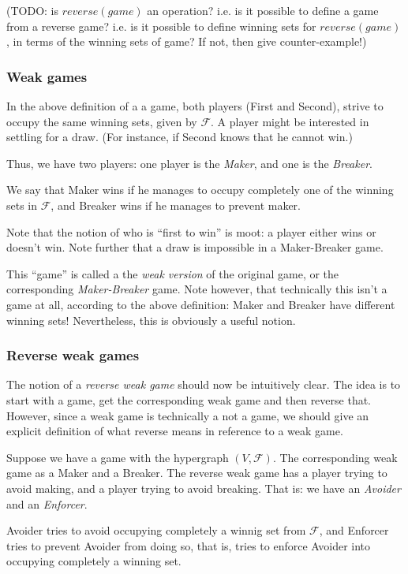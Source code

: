 (TODO: is $reverse(game)$ an operation? i.e. is it possible to define a game from a reverse game? i.e. is it possible to define winning sets for $reverse(game)$, in terms of the winning sets of game? If not, then give counter-example!)



\subsubsection{Weak games}

In the above definition of a a game, both players (First and Second), strive to occupy the same winning sets, given by $\mathcal F$. A player might be interested in settling for a draw. (For instance, if Second knows that he cannot win.) 

Thus, we have two players: one player is the \emph{Maker}, and one is the \emph{Breaker}.

We say that Maker wins if he manages to occupy completely one of the winning sets in $\mathcal F$, and Breaker wins if he manages to prevent maker.

Note that the notion of who is ``first to win'' is moot: a player either wins or doesn't win.
Note further that a draw is impossible in a Maker-Breaker game.

This ``game'' is called a the \emph{weak version} of the original game, or the corresponding \emph{Maker-Breaker} game.
Note however, that technically this isn't a game at all, according to the above definition: Maker and Breaker have different winning sets! Nevertheless, this is obviously a useful notion.

\subsubsection{Reverse weak games}

The notion of a \emph{reverse weak game} should now be intuitively clear.
The idea is to start with a game, get the corresponding weak game and then reverse that.
However, since a weak game is technically a not a game, we should give an explicit definition of what reverse means in reference to a weak game.

Suppose we have a game with the hypergraph $(V,\mathcal F)$.
The corresponding weak game as a Maker and a Breaker.
The reverse weak game has a player trying to avoid making, and a player trying to avoid breaking.
That is: we have an \emph{Avoider} and an \emph{Enforcer}.

Avoider tries to avoid occupying completely a winnig set from $\mathcal F$, and Enforcer tries to prevent Avoider from doing so, that is, tries to enforce Avoider into occupying completely a winning set.

